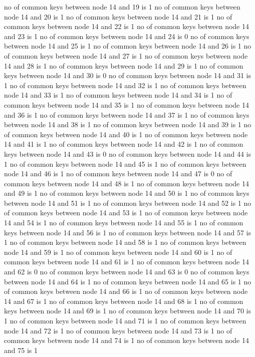 no of common keys between node 14 and 19 is 1
no of common keys between node 14 and 20 is 1
no of common keys between node 14 and 21 is 1
no of common keys between node 14 and 22 is 1
no of common keys between node 14 and 23 is 1
no of common keys between node 14 and 24 is 0
no of common keys between node 14 and 25 is 1
no of common keys between node 14 and 26 is 1
no of common keys between node 14 and 27 is 1
no of common keys between node 14 and 28 is 1
no of common keys between node 14 and 29 is 1
no of common keys between node 14 and 30 is 0
no of common keys between node 14 and 31 is 1
no of common keys between node 14 and 32 is 1
no of common keys between node 14 and 33 is 1
no of common keys between node 14 and 34 is 1
no of common keys between node 14 and 35 is 1
no of common keys between node 14 and 36 is 1
no of common keys between node 14 and 37 is 1
no of common keys between node 14 and 38 is 1
no of common keys between node 14 and 39 is 1
no of common keys between node 14 and 40 is 1
no of common keys between node 14 and 41 is 1
no of common keys between node 14 and 42 is 1
no of common keys between node 14 and 43 is 0
no of common keys between node 14 and 44 is 1
no of common keys between node 14 and 45 is 1
no of common keys between node 14 and 46 is 1
no of common keys between node 14 and 47 is 0
no of common keys between node 14 and 48 is 1
no of common keys between node 14 and 49 is 1
no of common keys between node 14 and 50 is 1
no of common keys between node 14 and 51 is 1
no of common keys between node 14 and 52 is 1
no of common keys between node 14 and 53 is 1
no of common keys between node 14 and 54 is 1
no of common keys between node 14 and 55 is 1
no of common keys between node 14 and 56 is 1
no of common keys between node 14 and 57 is 1
no of common keys between node 14 and 58 is 1
no of common keys between node 14 and 59 is 1
no of common keys between node 14 and 60 is 1
no of common keys between node 14 and 61 is 1
no of common keys between node 14 and 62 is 0
no of common keys between node 14 and 63 is 0
no of common keys between node 14 and 64 is 1
no of common keys between node 14 and 65 is 1
no of common keys between node 14 and 66 is 1
no of common keys between node 14 and 67 is 1
no of common keys between node 14 and 68 is 1
no of common keys between node 14 and 69 is 1
no of common keys between node 14 and 70 is 1
no of common keys between node 14 and 71 is 1
no of common keys between node 14 and 72 is 1
no of common keys between node 14 and 73 is 1
no of common keys between node 14 and 74 is 1
no of common keys between node 14 and 75 is 1
